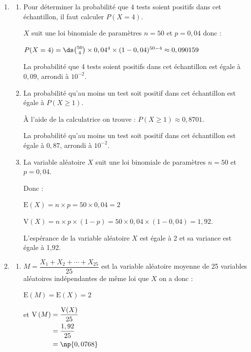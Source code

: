 \begin{enumerate}
	\item 
	\begin{enumerate}
		\item Pour déterminer la probabilité que 4 tests soient positifs dans cet échantillon, il faut calculer $P(X=4)$. 
		
		$X$ suit une loi binomiale de paramètres $n=50$ et $p=0,04$ donc : 
		
		$P(X=4) = \ds \binom{50}{4}  \times 0,04 ^{4} \times (1-0,04)^{50-4}\approx 0,090159 $
		
		La probabilité que 4 tests soient positifs dans cet échantillon est égale à $0,09$, arrondi  à $10^{-2}$.
		
		\item La probabilité qu'au moins un test soit positif dans cet échantillon est égale à $P(X\geqslant 1)$. 
		
		À l'aide de la calculatrice on trouve : $P(X\geqslant 1) \approx 0,8701$. 
		
		
		La probabilité qu'au moins un test soit positif dans cet échantillon est égale à $0,87$, arrondi à $10^{-2}$.
		\item  La variable aléatoire $X$ suit une loi binomiale de paramètres $n=50$ et $p=0,04$.
		
		Donc : 
		
		$\mathrm{E}(X)=n \times p = 50 \times 0,04 = 2$ 
		
		$\mathrm{V}(X) = n \times p \times (1-p)= 50 \times 0,04 \times (1-0,04) = 1,92$.
		
		L'espérance  de la variable aléatoire $X$ est égale à 2 et sa variance  est égale à 1,92. 
	\end{enumerate}
	
\item 

	\begin{enumerate}
		\item $M=\dfrac{X_{1}+X_{2}+\cdots+X_{25}}{25}$ est la variable aléatoire  moyenne de 25 variables aléatoires indépendantes de même loi que $X$ on a donc :
		
		
		
		$\mathrm{E}\left(M\right) = \mathrm{E}\left(X\right) = 2$
		
		et   $\begin{aligned}[t] \mathrm{V} \left(M\right) &= \dfrac {\mathrm{V}(X)}{25}\\
			&= \dfrac{1,92}{25}\\
			&=\np{0,0768}
		\end{aligned} $
		

\end{enumerate}
\end{enumerate}
